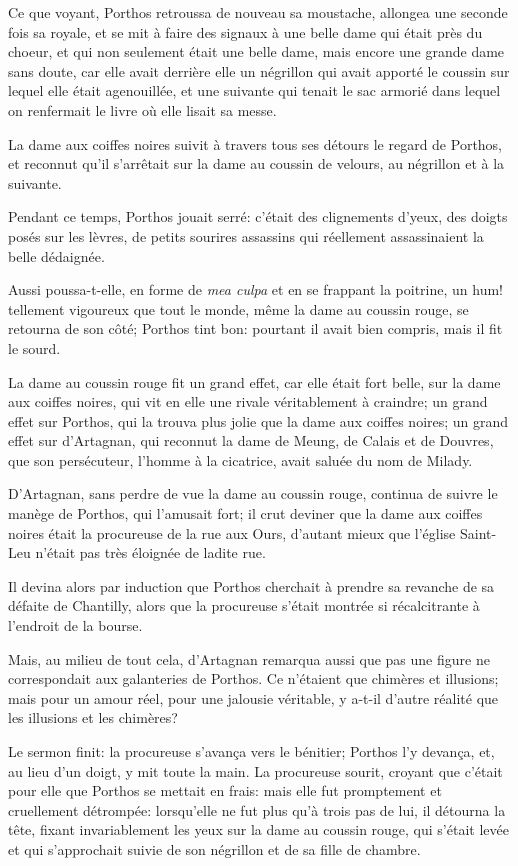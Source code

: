 Ce que voyant, Porthos retroussa de nouveau sa moustache, allongea une seconde fois sa royale, et se mit à faire des signaux à une belle dame qui était près du choeur, et qui non seulement était une belle dame, mais encore une grande dame sans doute, car elle avait derrière elle un négrillon qui avait apporté le coussin sur lequel elle était agenouillée, et une suivante qui tenait le sac armorié dans lequel on renfermait le livre où elle lisait sa messe. 

La dame aux coiffes noires suivit à travers tous ses détours le regard de Porthos, et reconnut qu'il s'arrêtait sur la dame au coussin de velours, au négrillon et à la suivante. 

Pendant ce temps, Porthos jouait serré: c'était des clignements d'yeux, des doigts posés sur les lèvres, de petits sourires assassins qui réellement assassinaient la belle dédaignée. 

Aussi poussa-t-elle, en forme de \textit{mea culpa} et en se frappant la poitrine, un hum! tellement vigoureux que tout le monde, même la dame au coussin rouge, se retourna de son côté; Porthos tint bon: pourtant il avait bien compris, mais il fit le sourd. 

La dame au coussin rouge fit un grand effet, car elle était fort belle, sur la dame aux coiffes noires, qui vit en elle une rivale véritablement à craindre; un grand effet sur Porthos, qui la trouva plus jolie que la dame aux coiffes noires; un grand effet sur d'Artagnan, qui reconnut la dame de Meung, de Calais et de Douvres, que son persécuteur, l'homme à la cicatrice, avait saluée du nom de Milady. 

D'Artagnan, sans perdre de vue la dame au coussin rouge, continua de suivre le manège de Porthos, qui l'amusait fort; il crut deviner que la dame aux coiffes noires était la procureuse de la rue aux Ours, d'autant mieux que l'église Saint-Leu n'était pas très éloignée de ladite rue. 

Il devina alors par induction que Porthos cherchait à prendre sa revanche de sa défaite de Chantilly, alors que la procureuse s'était montrée si récalcitrante à l'endroit de la bourse. 

Mais, au milieu de tout cela, d'Artagnan remarqua aussi que pas une figure ne correspondait aux galanteries de Porthos. Ce n'étaient que chimères et illusions; mais pour un amour réel, pour une jalousie véritable, y a-t-il d'autre réalité que les illusions et les chimères? 

Le sermon finit: la procureuse s'avança vers le bénitier; Porthos l'y devança, et, au lieu d'un doigt, y mit toute la main. La procureuse sourit, croyant que c'était pour elle que Porthos se mettait en frais: mais elle fut promptement et cruellement détrompée: lorsqu'elle ne fut plus qu'à trois pas de lui, il détourna la tête, fixant invariablement les yeux sur la dame au coussin rouge, qui s'était levée et qui s'approchait suivie de son négrillon et de sa fille de chambre. 

